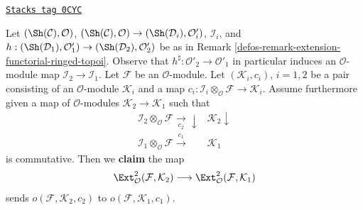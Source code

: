 \begin{remark}
\label{defos-remark-obstruction-extension-functorial-ringed-topoi}
\href{https://stacks.math.columbia.edu/tag/0CYC}{\texttt{Stacks tag 0CYC}}

Let $(\Sh(\mathcal{C}), \mathcal{O})$,
$(\Sh(\mathcal{C}), \mathcal{O}) \to (\Sh(\mathcal{D}_i), \mathcal{O}'_i)$,
$\mathcal{I}_i$, and $h : (\Sh(\mathcal{D}_1), \mathcal{O}'_1) \to
(\Sh(\mathcal{D}_2), \mathcal{O}'_2)$ be as in
Remark \ref{defos-remark-extension-functorial-ringed-topoi}.
Observe that $h^\sharp : \mathcal{O}'_2 \to \mathcal{O}'_1$
in particular induces an $\mathcal{O}$-module map
$\mathcal{I}_2 \to \mathcal{I}_1$.
Let $\mathcal{F}$ be an $\mathcal{O}$-module.
Let $(\mathcal{K}_i, c_i)$, $i = 1, 2$ be a pair
consisting of an $\mathcal{O}$-module $\mathcal{K}_i$ and a map
$c_i : \mathcal{I}_i \otimes_\mathcal{O} \mathcal{F} \to
\mathcal{K}_i$. Assume furthermore given a map
of $\mathcal{O}$-modules $\mathcal{K}_2 \to \mathcal{K}_1$
such that
$$
\begin{array}{cc}\mathcal{I}_2 \otimes_\mathcal{O} \mathcal{F}
\underset{c_2}{\longrightarrow}\downarrow & \mathcal{K}_2 \downarrow \\ \mathcal{I}_1 \otimes_\mathcal{O} \mathcal{F}
\overset{c_1}{\longrightarrow} & \mathcal{K}_1\end{array}
$$
is commutative. Then we {\bf claim} the map
$$
\Ext^2_\mathcal{O}(\mathcal{F}, \mathcal{K}_2)
\longrightarrow
\Ext^2_\mathcal{O}(\mathcal{F}, \mathcal{K}_1)
$$
sends $o(\mathcal{F}, \mathcal{K}_2, c_2)$ to
$o(\mathcal{F}, \mathcal{K}_1, c_1)$.


\end{remark}
